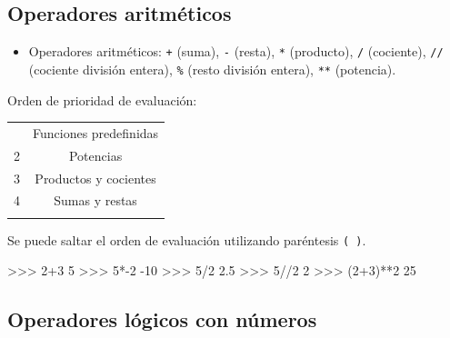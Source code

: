 \documentclass[
  spanish,
  a4paper,
]{scrreport}
\newenvironment{Shaded}{\begin{snugshade}}{\end{snugshade}}
\newcommand{\DecValTok}[1]{\textcolor[rgb]{0.68,0.00,0.00}{#1}}
\newcommand{\FloatTok}[1]{\textcolor[rgb]{0.68,0.00,0.00}{#1}}
\newcommand{\NormalTok}[1]{\textcolor[rgb]{0.00,0.23,0.31}{#1}}
\newcommand{\OperatorTok}[1]{\textcolor[rgb]{0.37,0.37,0.37}{#1}}
\newcounter{none} %
\providecommand{\tightlist}{%
  \setlength{\itemsep}{0pt}\setlength{\parskip}{0pt}}
\begin{document}
\subsection{Operadores aritméticos}\label{operadores-aritmuxe9ticos}

\begin{itemize}
\tightlist
\item
  Operadores aritméticos: \texttt{+} (suma), \texttt{-} (resta),
  \texttt{*} (producto), \texttt{/} (cociente), \texttt{//} (cociente
  división entera), \texttt{\%} (resto división entera), \texttt{**}
  (potencia).
\end{itemize}

Orden de prioridad de evaluación:

{\def\LTcaptype{none} %
\begin{longtable}[]{@{}cc@{}}
\toprule\noalign{}
\endhead
\bottomrule\noalign{}
\endlastfoot
1 & Funciones predefinidas \\
2 & Potencias \\
3 & Productos y cocientes \\
4 & Sumas y restas \\
& \\
\end{longtable}
}

Se puede saltar el orden de evaluación utilizando paréntesis
\texttt{(\ )}.

\begin{Shaded}
\begin{Highlighting}[]
\OperatorTok{\textgreater{}\textgreater{}\textgreater{}} \DecValTok{2}\OperatorTok{+}\DecValTok{3}
\DecValTok{5}
\OperatorTok{\textgreater{}\textgreater{}\textgreater{}} \DecValTok{5}\OperatorTok{*{-}}\DecValTok{2}
\OperatorTok{{-}}\DecValTok{10}
\OperatorTok{\textgreater{}\textgreater{}\textgreater{}} \DecValTok{5}\OperatorTok{/}\DecValTok{2}
\FloatTok{2.5}
\OperatorTok{\textgreater{}\textgreater{}\textgreater{}} \DecValTok{5}\OperatorTok{//}\DecValTok{2}
\DecValTok{2}
\OperatorTok{\textgreater{}\textgreater{}\textgreater{}}\NormalTok{ (}\DecValTok{2}\OperatorTok{+}\DecValTok{3}\NormalTok{)}\OperatorTok{**}\DecValTok{2}
\DecValTok{25}
\end{Highlighting}
\end{Shaded}

\subsection{Operadores lógicos con
números}\label{operadores-luxf3gicos-con-nuxfameros}
\end{document}

